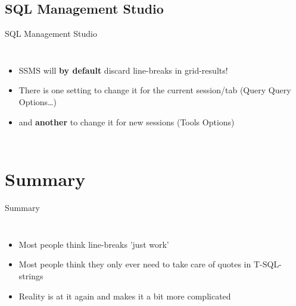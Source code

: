 \documentclass[english,aspectratio=169]{beamer}
\begin{document}
\subsection[SSMS]{SQL Management Studio}
\begin{frame}{SQL Management Studio}
\begin{columns}
        \begin{itemize}
        \item<1,4| only@1,4> SSMS will \textbf{by default} discard line-breaks in grid-results!
        \item<2-> There is one setting to change it for the current session/tab (Query \textrightarrow{} Query Options…)
        \item<3-> and \textbf{another} to change it for new sessions (Tools \textrightarrow{} Options)
        \end{itemize}
        \begin{center}
        \end{center}
    \end{columns}
\end{frame}

\section{Summary}

\begin{frame}{Summary}
\begin{columns}
    \begin{itemize}
        \item Most people think line-breaks 'just work'
        \item Most people think they only ever need to take care of quotes in T-SQL-strings
        \item Reality is at it again and makes it a bit more complicated
    \end{itemize}
        \begin{center}
        \end{center}
\end{columns}
\end{frame}
\end{document}

